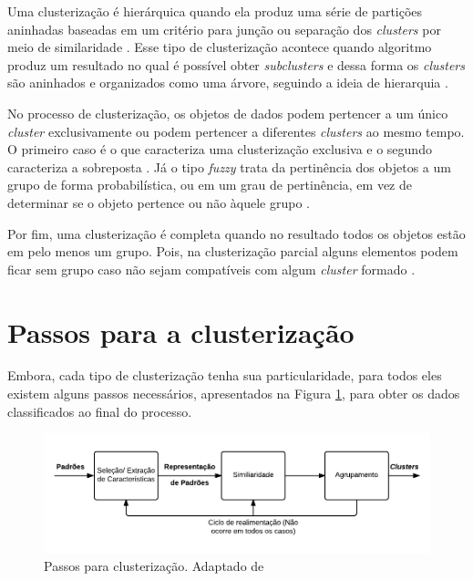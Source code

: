 Uma clusterização é hierárquica quando ela produz uma série
de partições aninhadas baseadas em um critério para junção ou separação dos \textit{clusters} por meio de similaridade \cite{clustering_review}. 
Esse tipo de clusterização acontece quando algoritmo
produz um resultado no qual é possível obter \textit{subclusters} e dessa forma os \textit{clusters} são aninhados
e organizados como uma árvore, seguindo a ideia de hierarquia \cite{tan2013data}.

No processo de clusterização, os objetos de dados podem pertencer a um único \textit{cluster} exclusivamente ou podem
pertencer a diferentes \textit{clusters} ao mesmo tempo. O primeiro caso é o que caracteriza uma clusterização exclusiva e o segundo caracteriza a sobreposta \cite{tan2013data}. 
Já o tipo \textit{fuzzy} trata da pertinência dos objetos a um grupo de forma probabilística, 
ou em um grau de pertinência, em vez de determinar se o objeto pertence ou não àquele grupo \cite{tan2013data, clustering_review}.

Por fim, uma clusterização é completa quando no resultado todos os objetos estão em pelo menos um grupo. 
Pois, na clusterização parcial alguns elementos podem ficar sem grupo caso não sejam compatíveis com algum \textit{cluster} formado \cite{tan2013data}.

\section{Passos para a clusterização}

Embora, cada tipo de clusterização tenha sua particularidade, para todos eles existem alguns passos necessários, apresentados na Figura \ref{fig:tasks_clustering}, 
para obter os dados classificados ao final do processo.

\begin{figure}[h]
\centering
\includegraphics[scale=0.5]{figuras/tasks_clustering.png}
\caption{Passos para clusterização. Adaptado de }
\label{fig:tasks_clustering}
\end{figure}

